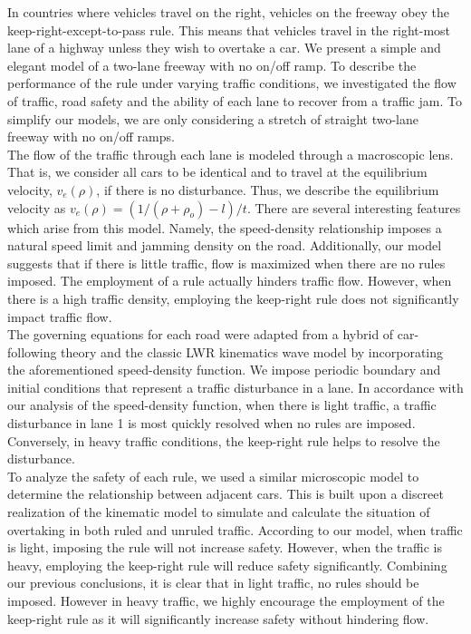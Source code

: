 In countries where vehicles travel on the right, vehicles on the freeway obey the keep-right-except-to-pass rule. This means that vehicles travel in the right-most lane of a highway unless they wish to overtake a car. We present a simple and elegant model of a two-lane freeway with no on/off ramp. To describe the performance of the rule under varying traffic conditions, we investigated the flow of traffic, road safety and the ability of each lane to recover from a traffic jam. To simplify our models, we are only considering a stretch of straight two-lane freeway with no on/off ramps. \\
The flow of the traffic through each lane is modeled through a macroscopic lens. That is, we consider all cars to be identical and to travel at the equilibrium velocity, $v_e(\rho)$, if there is no disturbance. Thus, we describe the equilibrium velocity as $v_e(\rho)=(1/(\rho+\rho_o)-l)/t$. There are several interesting features which arise from this model. Namely, the speed-density relationship imposes a natural speed limit and jamming density on the road. Additionally, our model suggests that if there is little traffic, flow is maximized when there are no rules imposed. The employment of a rule actually hinders traffic flow. However, when there is a high traffic density, employing the keep-right rule does not significantly impact traffic flow.  \\
The governing equations for each road were adapted from a hybrid of car-following theory and the classic LWR kinematics wave model \cite{tang_2004} by incorporating the aforementioned speed-density function. We impose periodic boundary and initial conditions that represent a traffic disturbance in a lane. In accordance with our analysis of the speed-density function, when there is light traffic, a traffic disturbance in lane 1 is most quickly resolved when no rules are imposed. Conversely, in heavy traffic conditions, the keep-right rule helps to resolve the disturbance. \\
To analyze the safety of each rule, we used a similar microscopic model to determine the relationship between adjacent cars. This is built upon a discreet realization of the kinematic model to simulate and calculate the situation of overtaking in both ruled and unruled traffic. According to our model, when traffic is light, imposing the rule will not increase safety. However, when the traffic is heavy, employing the keep-right rule will reduce safety significantly. Combining our previous conclusions, it is clear that in light traffic, no rules should be imposed. However in heavy traffic, we highly encourage the employment of the keep-right rule as it will significantly increase safety without hindering flow. 
